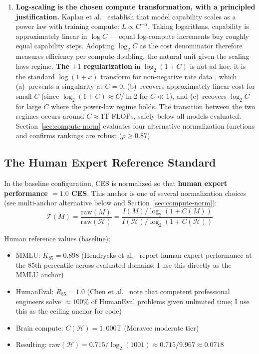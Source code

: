 \documentclass[12pt]{article}
\begin{document}
\begin{enumerate}
    \item \textbf{Log-scaling is the chosen compute transformation, with a principled justification.} Kaplan et al.\ \cite{kaplan2020} establish that model capability scales as a power law with training compute: $L \propto C^{-\alpha}$. Taking logarithms, capability is approximately linear in $\log C$ --- equal log-compute increments buy roughly equal capability steps. Adopting $\log_2 C$ as the cost denominator therefore measures efficiency per compute-doubling, the natural unit given the scaling laws regime. \textbf{The $+1$ regularization} in $\log_2(1+C)$ is not ad hoc: it is the standard $\log(1+x)$ transform for non-negative rate data \cite{shannon1948}, which (a)~prevents a singularity at $C=0$, (b)~recovers approximately linear cost for small $C$ (since $\log_2(1+C) \approx C/\ln 2$ for $C \ll 1$), and (c)~recovers $\log_2 C$ for large $C$ where the power-law regime holds. The transition between the two regimes occurs around $C \approx 1$T FLOPs, safely below all models evaluated. Section~\ref{sec:compute-norm} evaluates four alternative normalization functions and confirms rankings are robust ($\rho \geq 0.87$).
\end{enumerate}

\subsection{The Human Expert Reference Standard}

In the baseline configuration, CES is normalized so that \textbf{human expert performance $= 1.0$ CES}. This anchor is one of several normalization choices (see multi-anchor alternative below and Section~\ref{sec:compute-norm}):
\begin{equation}
\mathcal{T}(M) = \frac{\text{raw}(M)}{\text{raw}(\mathcal{H})} = \frac{I(M)/\log_2(1+C(M))}{I(\mathcal{H})/\log_2(1+C(\mathcal{H}))}
\end{equation}

Human reference values (baseline):
\begin{itemize}
    \item MMLU: $K_{85} = 0.898$ (Hendrycks et al.\ \cite{hendrycks2021} report human expert performance at the 85th percentile across evaluated domains; I use this directly as the MMLU anchor)
    \item HumanEval: $R_{85} = 1.0$ (Chen et al.\ \cite{chen2021} note that competent professional engineers solve $\approx 100\%$ of HumanEval problems given unlimited time; I use this as the ceiling anchor for code)
    \item Brain compute: $C(\mathcal{H}) = 1{,}000$T (Moravec \cite{moravec1998} moderate tier)
    \item Resulting: $\text{raw}(\mathcal{H}) = 0.715 / \log_2(1001) \approx 0.715 / 9.967 \approx 0.0718$
\end{itemize}
\end{document}
